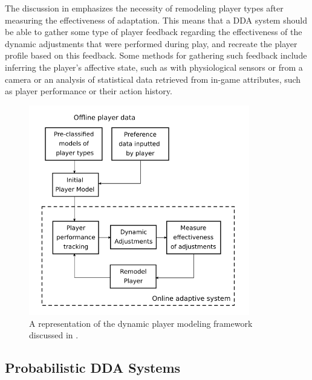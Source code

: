 The discussion in \cite{ARTICLE_DynamicPlayerModelling} emphasizes the necessity of remodeling player types after measuring the effectiveness of adaptation. This means that a DDA system should be able to gather some type of player feedback regarding the effectiveness of the dynamic adjustments that were performed during play, and recreate the player profile based on this feedback. Some methods for gathering such feedback include inferring the player's affective state, such as with physiological sensors or from a camera or an analysis of statistical data retrieved from in-game attributes, such as player performance or their action history.

\begin{figure}[!ht]
    \caption{A representation of the dynamic player modeling framework discussed in \cite{ARTICLE_DynamicPlayerModelling}.}
    \begin{center}
        \includegraphics[width=26em]{figures/fig-dynamic-player-model.png}
    \end{center}
    \label{fig:dynamic-player-model}
\end{figure}


\subsection{Probabilistic DDA Systems}
\label{sec:statistical-adjustments}

